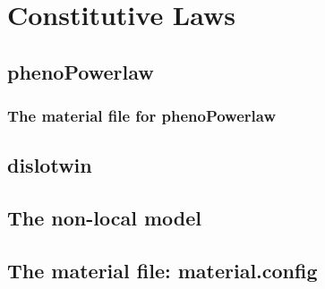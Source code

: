 \chapter{Constitutive Laws}

\section{phenoPowerlaw}
\subsection{The material file for phenoPowerlaw}
\section{dislotwin}
\section{The non-local model}

\section{The material file: material.config}

